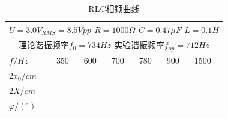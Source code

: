 \fancypage{\fbox}{}
\begin{table}[h]
	\centering
	\caption*{RLC相频曲线}
    \begin{tabular}[\linewidth]{|m{2cm}|m{2cm}|m{2cm}|m{2cm}|m{2cm}|m{2cm}|m{2cm}|}
        \hline
        \multicolumn{7}{|c|}{$U=3.0V_{RMS}=8.5Vpp$  $R=1000\Omega $  $C=0.47\mu F$  $L=0.1H$}\\
        \hline
		\multicolumn{7}{|c|}{理论谐振频率$f_0=734Hz$  实验谐振频率$f_{op}=712Hz$}\\
		\hline
        $f/Hz$ & 350 & 600 & 700 & 780 & 900 & 1500 \\
        \hline
        $2x_0/cm$ & & & & & & \\
        \hline
        $2X/cm$ & & & & & & \\
        \hline
        $\varphi/(^{\circ} )$ & & & & & & \\
        \hline
    \end{tabular}	
\end{table}
